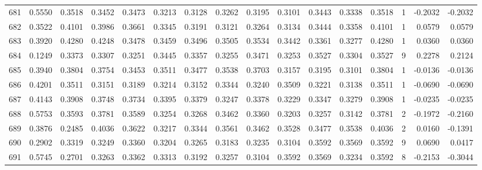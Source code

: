 \begin{tabular}{lrrrrrrrrrrrrrrr}
681 &      0.5550 &  0.3518 &  0.3452 &  0.3473 &  0.3213 &  0.3128 &  0.3262 &  0.3195 &  0.3101 &  0.3443 &   0.3338 &     0.3518 &      1 &                   -0.2032 &                    -0.2032 \\
682 &      0.3522 &  0.4101 &  0.3986 &  0.3661 &  0.3345 &  0.3191 &  0.3121 &  0.3264 &  0.3134 &  0.3444 &   0.3358 &     0.4101 &      1 &                    0.0579 &                     0.0579 \\
683 &      0.3920 &  0.4280 &  0.4248 &  0.3478 &  0.3459 &  0.3496 &  0.3505 &  0.3534 &  0.3442 &  0.3361 &   0.3277 &     0.4280 &      1 &                    0.0360 &                     0.0360 \\
684 &      0.1249 &  0.3373 &  0.3307 &  0.3251 &  0.3445 &  0.3357 &  0.3255 &  0.3471 &  0.3253 &  0.3527 &   0.3304 &     0.3527 &      9 &                    0.2278 &                     0.2124 \\
685 &      0.3940 &  0.3804 &  0.3754 &  0.3453 &  0.3511 &  0.3477 &  0.3538 &  0.3703 &  0.3157 &  0.3195 &   0.3101 &     0.3804 &      1 &                   -0.0136 &                    -0.0136 \\
686 &      0.4201 &  0.3511 &  0.3151 &  0.3189 &  0.3214 &  0.3152 &  0.3344 &  0.3240 &  0.3509 &  0.3221 &   0.3138 &     0.3511 &      1 &                   -0.0690 &                    -0.0690 \\
687 &      0.4143 &  0.3908 &  0.3748 &  0.3734 &  0.3395 &  0.3379 &  0.3247 &  0.3378 &  0.3229 &  0.3347 &   0.3279 &     0.3908 &      1 &                   -0.0235 &                    -0.0235 \\
688 &      0.5753 &  0.3593 &  0.3781 &  0.3589 &  0.3254 &  0.3268 &  0.3462 &  0.3360 &  0.3203 &  0.3257 &   0.3142 &     0.3781 &      2 &                   -0.1972 &                    -0.2160 \\
689 &      0.3876 &  0.2485 &  0.4036 &  0.3622 &  0.3217 &  0.3344 &  0.3561 &  0.3462 &  0.3528 &  0.3477 &   0.3538 &     0.4036 &      2 &                    0.0160 &                    -0.1391 \\
690 &      0.2902 &  0.3319 &  0.3249 &  0.3360 &  0.3204 &  0.3265 &  0.3183 &  0.3235 &  0.3104 &  0.3592 &   0.3569 &     0.3592 &      9 &                    0.0690 &                     0.0417 \\
691 &      0.5745 &  0.2701 &  0.3263 &  0.3362 &  0.3313 &  0.3192 &  0.3257 &  0.3104 &  0.3592 &  0.3569 &   0.3234 &     0.3592 &      8 &                   -0.2153 &                    -0.3044 \\

\end{tabular}
